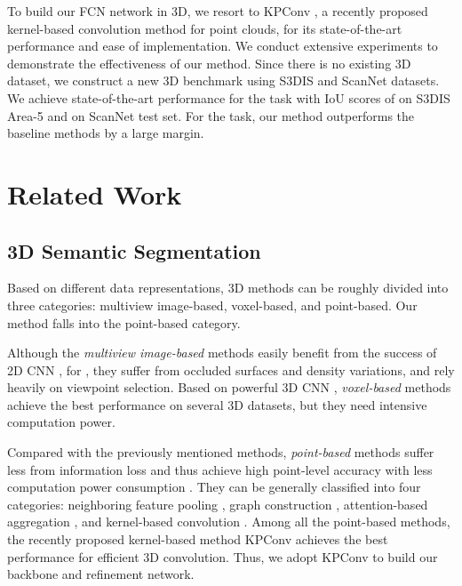 \documentclass[runningheads]{llncs}
\begin{document}
{To build our FCN network in 3D, we resort to KPConv \cite{thomas2019kpconv}, a recently proposed kernel-based convolution method for point clouds, for its state-of-the-art performance and ease of implementation.
We conduct extensive experiments to demonstrate the {effectiveness of our method.} Since there is no existing 3D {\SemEdgeD} dataset, we construct a new 3D {\SemEdgeD} benchmark using S3DIS \cite{armeni_cvpr16} and ScanNet \cite{dai2017scannet} datasets. We achieve state-of-the-art performance for the {\SemSeg} task with IoU scores of  on S3DIS Area-5 and  on ScanNet test set. For the {\SemEdgeD} task, {our method} outperforms the baseline methods by a large margin.}


%
 
\section{Related Work}

\subsection{3D Semantic Segmentation}

Based on different data representations, 3D {\SemSeg} methods can be roughly divided into three categories: multiview image-based, voxel-based, and point-based. Our method falls into the point-based category.


Although the \emph{multiview image-based} methods
{easily}
benefit from 
the success of 2D CNN \cite{boulch2017unstructured,lawin2017deep}, for {\SemSeg}, they suffer from occluded surfaces {and} density variations{,} and rely heavily on viewpoint selection. 
{Based on}
powerful 3D CNN \cite{roynard2018classification,ben20183dmfv,le2018pointgrid,meng2018vvnet,riegler2017octnet,graham20183d,Choy_2019}, \emph{voxel-based} methods achieve the best performance on several 3D {\SemSeg} datasets, but {they need intensive computation power}.


{{Compared}
with the previously mentioned methods, \emph{point-based} methods suffer less from information loss and {thus} achieve high point-level accuracy with less computation power consumption \cite{qi2017pointnet,qi2017pointnet++}.}
They can be generally classified into four categories:  neighboring feature pooling \cite{li2018so,Huang_2018,zhao2019pointweb,zhang2019shellnet}, graph construction \cite{wang2019dynamic,wang2019graph,jiang2019hierarchical,liu2019dynamic}, attention-based aggregation \cite{xie2018attentional}{,} and kernel-based convolution \cite{Su_2018,hua2018pointwise,wu2019pointconv,Lei_2019,Komarichev_2019,Lan_2019,mao2019interpolated,thomas2019kpconv}. {Among all the point-based methods, the recently proposed kernel-based method KPConv \cite{thomas2019kpconv}
achieves the best performance for efficient 3D convolution. Thus, we adopt KPConv
to build our backbone and refinement network.}
\end{document}
